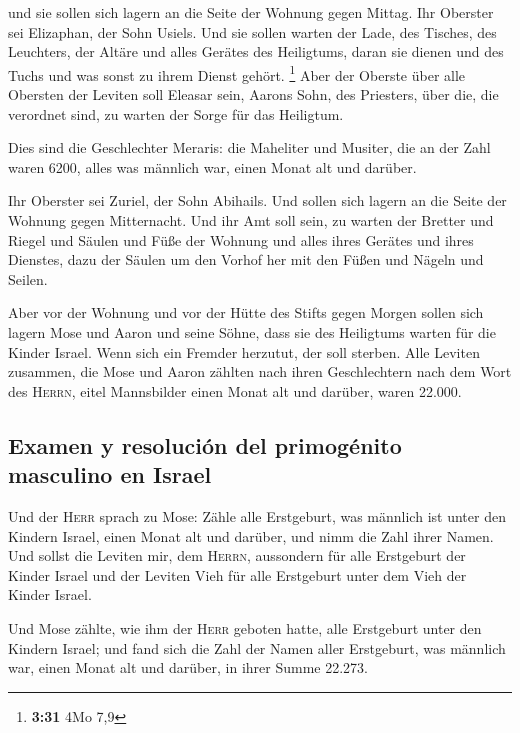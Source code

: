  und sie sollen sich lagern an die Seite der Wohnung
gegen Mittag.  Ihr Oberster sei Elizaphan, der Sohn
Usiels.  Und sie sollen warten der Lade, des Tisches, des
Leuchters, der Altäre und alles Gerätes des Heiligtums, daran sie dienen
und des Tuchs und was sonst zu ihrem Dienst gehört. \footnote{\textbf{3:31}
  4Mo 7,9}  Aber der Oberste über alle Obersten der
Leviten soll Eleasar sein, Aarons Sohn, des Priesters, über die, die
verordnet sind, zu warten der Sorge für das Heiligtum.

 Dies sind die Geschlechter Meraris: die Maheliter und
Musiter,  die an der Zahl waren 6200, alles was männlich
war, einen Monat alt und darüber.

 Ihr Oberster sei Zuriel, der Sohn Abihails. Und sollen
sich lagern an die Seite der Wohnung gegen Mitternacht. 
Und ihr Amt soll sein, zu warten der Bretter und Riegel und Säulen und
Füße der Wohnung und alles ihres Gerätes und ihres Dienstes,
 dazu der Säulen um den Vorhof her mit den Füßen und
Nägeln und Seilen.

 Aber vor der Wohnung und vor der Hütte des Stifts gegen
Morgen sollen sich lagern Mose und Aaron und seine Söhne, dass sie des
Heiligtums warten für die Kinder Israel. Wenn sich ein Fremder herzutut,
der soll sterben.  Alle Leviten zusammen, die Mose und
Aaron zählten nach ihren Geschlechtern nach dem Wort des \textsc{Herrn},
eitel Mannsbilder einen Monat alt und darüber, waren 22.000.

\hypertarget{examen-y-resoluciuxf3n-del-primoguxe9nito-masculino-en-israel}{%
\subsection{Examen y resolución del primogénito masculino en
Israel}\label{examen-y-resoluciuxf3n-del-primoguxe9nito-masculino-en-israel}}

 Und der \textsc{Herr} sprach zu Mose: Zähle alle
Erstgeburt, was männlich ist unter den Kindern Israel, einen Monat alt
und darüber, und nimm die Zahl ihrer Namen.  Und sollst
die Leviten mir, dem \textsc{Herrn}, aussondern für alle Erstgeburt der
Kinder Israel und der Leviten Vieh für alle Erstgeburt unter dem Vieh
der Kinder Israel.

 Und Mose zählte, wie ihm der \textsc{Herr} geboten
hatte, alle Erstgeburt unter den Kindern Israel;  und
fand sich die Zahl der Namen aller Erstgeburt, was männlich war, einen
Monat alt und darüber, in ihrer Summe 22.273.

